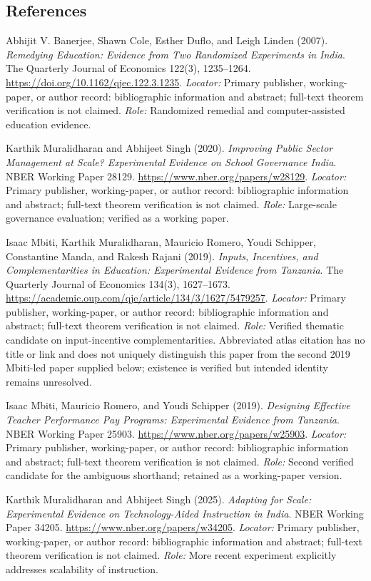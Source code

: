 \documentclass[11pt,a4paper]{article}
\begin{document}
\subsection*{References}
\begin{enumerate}[label=\textnormal{[S\arabic*]},leftmargin=*]
\item Abhijit V. Banerjee, Shawn Cole, Esther Duflo, and Leigh Linden (2007). \emph{Remedying Education: Evidence from Two Randomized Experiments in India}. The Quarterly Journal of Economics 122(3), 1235--1264. \url{https://doi.org/10.1162/qjec.122.3.1235}. \textit{Locator:} Primary publisher, working-paper, or author record: bibliographic information and abstract; full-text theorem verification is not claimed. \textit{Role:} Randomized remedial and computer-assisted education evidence.
\item Karthik Muralidharan and Abhijeet Singh (2020). \emph{Improving Public Sector Management at Scale? Experimental Evidence on School Governance India}. NBER Working Paper 28129. \url{https://www.nber.org/papers/w28129}. \textit{Locator:} Primary publisher, working-paper, or author record: bibliographic information and abstract; full-text theorem verification is not claimed. \textit{Role:} Large-scale governance evaluation; verified as a working paper.
\item Isaac Mbiti, Karthik Muralidharan, Mauricio Romero, Youdi Schipper, Constantine Manda, and Rakesh Rajani (2019). \emph{Inputs, Incentives, and Complementarities in Education: Experimental Evidence from Tanzania}. The Quarterly Journal of Economics 134(3), 1627--1673. \url{https://academic.oup.com/qje/article/134/3/1627/5479257}. \textit{Locator:} Primary publisher, working-paper, or author record: bibliographic information and abstract; full-text theorem verification is not claimed. \textit{Role:} Verified thematic candidate on input-incentive complementarities. Abbreviated atlas citation has no title or link and does not uniquely distinguish this paper from the second 2019 Mbiti-led paper supplied below; existence is verified but intended identity remains unresolved.
\item Isaac Mbiti, Mauricio Romero, and Youdi Schipper (2019). \emph{Designing Effective Teacher Performance Pay Programs: Experimental Evidence from Tanzania}. NBER Working Paper 25903. \url{https://www.nber.org/papers/w25903}. \textit{Locator:} Primary publisher, working-paper, or author record: bibliographic information and abstract; full-text theorem verification is not claimed. \textit{Role:} Second verified candidate for the ambiguous shorthand; retained as a working-paper version.
\item Karthik Muralidharan and Abhijeet Singh (2025). \emph{Adapting for Scale: Experimental Evidence on Technology-Aided Instruction in India}. NBER Working Paper 34205. \url{https://www.nber.org/papers/w34205}. \textit{Locator:} Primary publisher, working-paper, or author record: bibliographic information and abstract; full-text theorem verification is not claimed. \textit{Role:} More recent experiment explicitly addresses scalability of instruction.
\end{enumerate}
\end{document}
